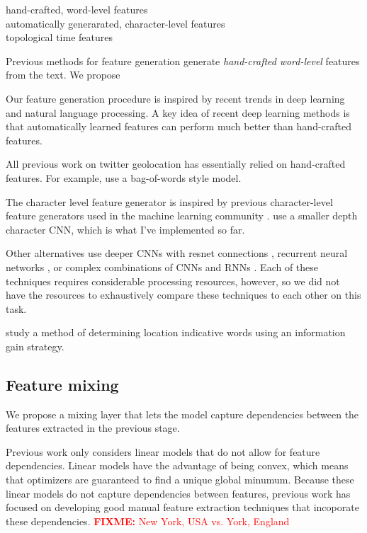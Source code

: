\documentclass{article}
\newcommand{\fixme}[1]{\textcolor{red}{\textbf{FIXME:} {#1}}}
\begin{document}
\begin{description}
    \item[hand-crafted, word-level features]
    \item[automatically generarated, character-level features]
    \item[topological time features]
\end{description}
Previous methods for feature generation generate \emph{hand-crafted} \emph{word-level} features from the text.
We propose 

Our feature generation procedure is inspired by recent trends in deep learning and natural language processing.
A key idea of recent deep learning methods is that automatically learned features can perform much better than hand-crafted features.

All previous work on twitter geolocation has essentially relied on hand-crafted features.
For example, \citet{} use a bag-of-words style model.

The character level feature generator is inspired by previous character-level feature generators used in the machine learning community \citep{}.
\citet{zhang2015character} use a smaller depth character CNN, which is what I've implemented so far.

Other alternatives use deeper CNNs with resnet connections \citep{conneau2017very}, recurrent neural networks \citep{chung2016character}, or complex combinations of CNNs and RNNs \citep{kim2016character,jozefowicz2016exploring}.
Each of these techniques requires considerable processing resources, however, 
so we did not have the resources to exhaustively compare these techniques to each other on this task.

\citet{han2012geolocation} study a method of determining location indicative words using an information gain strategy.

\subsection{Feature mixing}

We propose a mixing layer that lets the model capture dependencies between the features extracted in the previous stage.

Previous work only considers linear models that do not allow for feature dependencies.
Linear models have the advantage of being convex,
which means that optimizers are guaranteed to find a unique global minumum.
Because these linear models do not capture dependencies between features,
previous work has focused on developing good manual feature extraction techniques that incoporate these dependencies.
\fixme{New York, USA vs. York, England}
\end{document}
